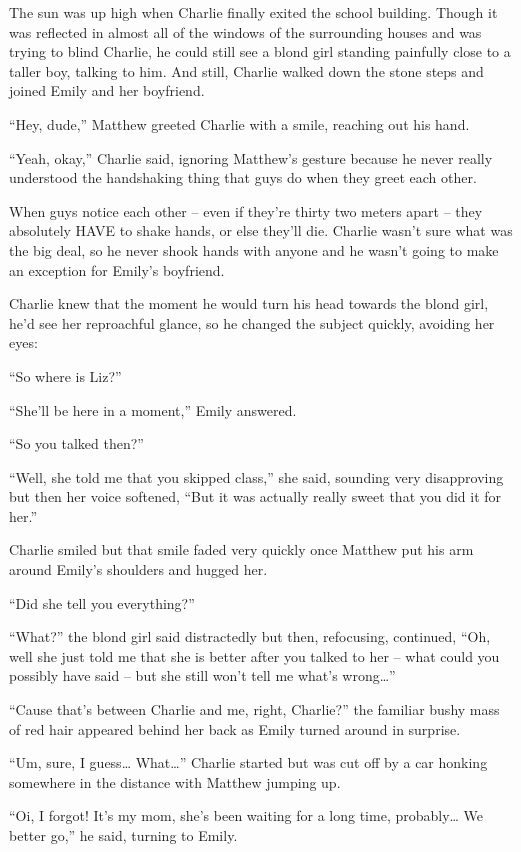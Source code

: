 The sun was up high when Charlie finally exited the school building. Though it was reflected in almost all of the windows of the surrounding houses and was trying to blind Charlie, he could still see a blond girl standing painfully close to a taller boy, talking to him.
And still, Charlie walked down the stone steps and joined Emily and her boyfriend.

“Hey, dude,” Matthew greeted Charlie with a smile, reaching out his hand.

“Yeah, okay,” Charlie said, ignoring Matthew’s gesture because he never really understood the handshaking thing that guys do when they greet each other.

When guys notice each other – even if they’re thirty two meters apart – they absolutely HAVE to shake hands, or else they’ll die. Charlie wasn’t sure what was the big deal, so he never shook hands with anyone and he wasn’t going to make an exception for Emily’s boyfriend.

Charlie knew that the moment he would turn his head towards the blond girl, he’d see her reproachful glance, so he changed the subject quickly, avoiding her eyes:

“So where is Liz?”

“She’ll be here in a moment,” Emily answered.

“So you talked then?”

“Well, she told me that you skipped class,” she said, sounding very disapproving but then her voice softened, “But it was actually really sweet that you did it for her.”

Charlie smiled but that smile faded very quickly once Matthew put his arm around Emily’s shoulders and hugged her.

“Did she tell you everything?”

“What?” the blond girl said distractedly but then, refocusing, continued, “Oh, well she just told me that she is better after you talked to her – what could you possibly have said – but she still won’t tell me what’s wrong…”

“Cause that’s between Charlie and me, right, Charlie?” the familiar bushy mass of red hair appeared behind her back as Emily turned around in surprise.

“Um, sure, I guess… What…” Charlie started but was cut off by a car honking somewhere in the distance with Matthew jumping up.

“Oi, I forgot! It’s my mom, she’s been waiting for a long time, probably… We better go,” he said, turning to Emily.

